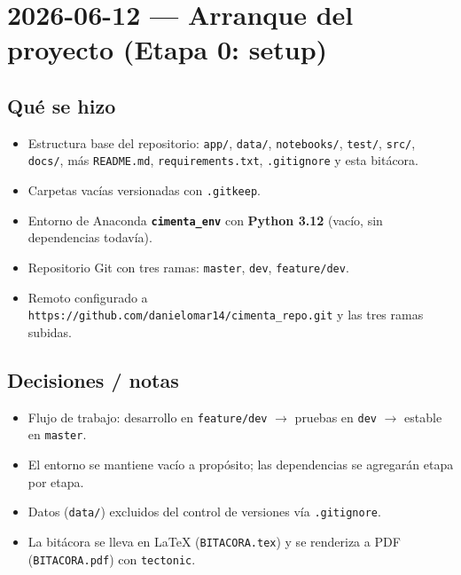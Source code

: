 \documentclass[11pt]{article}
\newcommand{\codigo}[1]{\texttt{#1}}
\begin{document}
\section*{2026-06-12 — Arranque del proyecto (Etapa 0: setup)}

\subsection*{Qué se hizo}
\begin{itemize}
  \item Estructura base del repositorio: \codigo{app/}, \codigo{data/},
        \codigo{notebooks/}, \codigo{test/}, \codigo{src/}, \codigo{docs/},
        más \codigo{README.md}, \codigo{requirements.txt}, \codigo{.gitignore}
        y esta bitácora.
  \item Carpetas vacías versionadas con \codigo{.gitkeep}.
  \item Entorno de Anaconda \textbf{\codigo{cimenta\_env}} con \textbf{Python 3.12}
        (vacío, sin dependencias todavía).
  \item Repositorio Git con tres ramas: \codigo{master}, \codigo{dev},
        \codigo{feature/dev}.
  \item Remoto configurado a
        \codigo{https://github.com/danielomar14/cimenta\_repo.git} y las tres
        ramas subidas.
\end{itemize}

\subsection*{Decisiones / notas}
\begin{itemize}
  \item Flujo de trabajo: desarrollo en \codigo{feature/dev}
        $\rightarrow$ pruebas en \codigo{dev}
        $\rightarrow$ estable en \codigo{master}.
  \item El entorno se mantiene vacío a propósito; las dependencias se agregarán
        etapa por etapa.
  \item Datos (\codigo{data/}) excluidos del control de versiones vía
        \codigo{.gitignore}.
  \item La bitácora se lleva en LaTeX (\codigo{BITACORA.tex}) y se renderiza a
        PDF (\codigo{BITACORA.pdf}) con \codigo{tectonic}.
\end{itemize}
\end{document}
